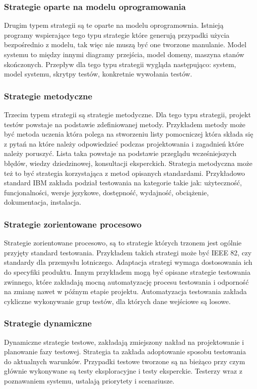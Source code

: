 \subsubsection{Strategie oparte na modelu oprogramowania}
Drugim typem strategii są te oparte na modelu oprogramownia.  Istnieją programy wspierające tego typu strategie które generują przypadki użycia bezpośrednio z modelu, tak więc nie muszą być one tworzone manulanie.
Model systemu to między innymi diagramy przejścia, model domeny, maszyna stanów skończonych. Przepływ dla tego typu strategii wygląda następująco: system, model systemu, skrytpy testów, konkretnie wywołania testów.
\subsubsection{Strategie metodyczne}
Trzecim typem strategii są strategie metodyczne. Dla tego typu strategii, projekt testów powstaje na podstawie zdefiniowanej metody. Przykładem metody może być metoda uczenia która polega na stworzeniu listy pomocniczej która składa się z pytań na które należy odpowiedzieć podczas projektowania i zagadnień które należy poruszyć. Lista taka powstaje na podstawie przeglądu wcześniejszych błędów, wiedzy dziedzinowej, konsultacji eksperckich. Strategia metodyczna może też to być strategia korzystająca z metod opisanych standardami. Przykładowo standard IBM zakłada podział testowania na kategorie takie jak: użyteczność, funcjonalności, wersje językowe, dostępność, wydajność, obciążenie, dokumentacja, instalacja.
\subsubsection{Strategie zorientowane procesowo}
Strategie zorientowane procesowo, są to strategie których trzonem jest ogólnie przyjęty standard testowania. Przykładem takich strategi może być IEEE 82, czy standardy dla przemysłu lotniczego. Adaptacja strategi wymaga dostosowania ich do specyfiki produktu. Innym przykładem mogą być opisane strategie testowania zwinnego, które zakładają mocną automatyzację procesu testowania i odporność na zmianę nawet w późnym etapie projektu. Automatyzacja testowania zakłada cykliczne wykonywanie grup testów, dla których dane wejściowe są losowe.
\subsubsection{Strategie dynamiczne}
Dynamiczne strategie testowe, zakładają zmiejszony nakład na projektowanie i planowanie fazy testowej. Strategia ta zakłada adoptowanie sposobu testowania do aktualnych warunków. Przypadki testowe tworzone są na bieżąco przy czym głównie wykonywane są testy eksploracyjne i testy eksperckie. Testerzy wraz z poznawaniem systemu, ustalają priorytety i scenariusze.
